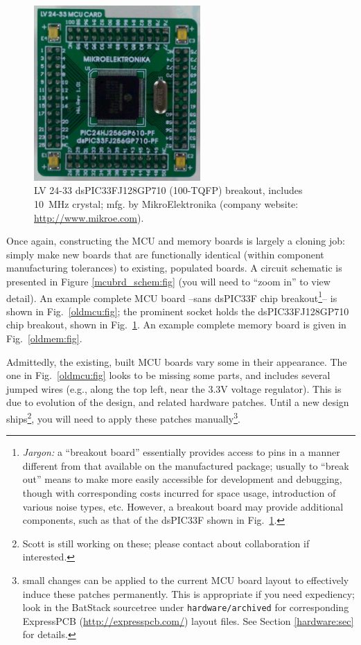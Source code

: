 \documentclass[letterpaper]{article}
\begin{document}
\begin{figure}
\centering
\includegraphics[width=2.5in]{figures/mikro_dspic_breakout.jpg}
\caption[MikroElektronika dsPIC33F breakout LV 24-33 board]{LV 24-33
  dsPIC33FJ128GP710 (100-TQFP) breakout, includes 10~MHz crystal;
  mfg. by MikroElektronika (company website:
  \url{http://www.mikroe.com}).}
\label{mikropic:fig}
\end{figure}

Once again, constructing the MCU and memory boards is largely a
cloning job: simply make new boards that are functionally identical
(within component manufacturing tolerances) to existing, populated
boards. A circuit schematic is presented in Figure
\ref{mcubrd_schem:fig} (you will need to ``zoom in'' to view
detail). An example complete MCU board --sans dsPIC33F chip
breakout\footnote{\textit{Jargon:} a ``breakout board'' essentially
  provides access to pins in a manner different from that available on
  the manufactured package; usually to ``break out'' means to make
  more easily accessible for development and debugging, though with
  corresponding costs incurred for space usage, introduction of
  various noise types, etc. However, a breakout board may provide
  additional components, such as that of the dsPIC33F shown in
  Fig.~\ref{mikropic:fig}.}-- is shown in Fig.~\ref{oldmcu:fig}; the
prominent socket holds the dsPIC33FJ128GP710 chip breakout, shown in
Fig.~\ref{mikropic:fig}. An example complete memory board is given in
Fig.~\ref{oldmem:fig}.

Admittedly, the existing, built MCU boards vary some in their
appearance. The one in Fig.~\ref{oldmcu:fig} looks to be missing some
parts, and includes several jumped wires (e.g., along the top left,
near the $3.3$V voltage regulator). This is due to evolution of the
design, and related hardware patches. Until a new design
ships\footnote{Scott is still working on these; please contact about
  collaboration if interested.}, you will need to apply these patches
manually\footnote{small changes can be applied to the current MCU
  board layout to effectively induce these patches permanently. This
  is appropriate if you need expediency; look in the BatStack
  sourcetree under \texttt{hardware/archived} for corresponding
  ExpressPCB (\url{http://expresspcb.com/}) layout files. See Section
  \ref{hardware:sec} for details.}.
\end{document}
